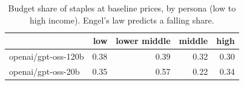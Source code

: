 \begin{table}[!htbp]\centering\small
\caption{Budget share of staples at baseline prices, by persona (low to high income). Engel's law predicts a falling share.}\label{tab:staples_share_by_persona}
\begin{tabular}{lrrrr}
\hline
 & low & lower middle & middle & high \\ \hline
openai/gpt-oss-120b & 0.38 & 0.39 & 0.32 & 0.30 \\
openai/gpt-oss-20b & 0.35 & 0.57 & 0.22 & 0.34 \\
\hline
\end{tabular}
\end{table}